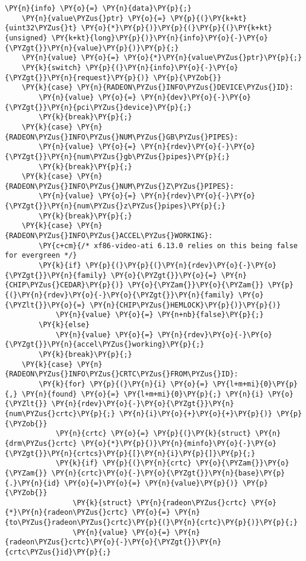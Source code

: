 \begin{Verbatim}[commandchars=\\\{\}]
	\PY{n}{info} \PY{o}{=} \PY{n}{data}\PY{p}{;}
	\PY{n}{value\PYZus{}ptr} \PY{o}{=} \PY{p}{(}\PY{k+kt}{uint32\PYZus{}t} \PY{o}{*}\PY{p}{)}\PY{p}{(}\PY{p}{(}\PY{k+kt}{unsigned} \PY{k+kt}{long}\PY{p}{)}\PY{n}{info}\PY{o}{-}\PY{o}{\PYZgt{}}\PY{n}{value}\PY{p}{)}\PY{p}{;}
	\PY{n}{value} \PY{o}{=} \PY{o}{*}\PY{n}{value\PYZus{}ptr}\PY{p}{;}
	\PY{k}{switch} \PY{p}{(}\PY{n}{info}\PY{o}{-}\PY{o}{\PYZgt{}}\PY{n}{request}\PY{p}{)} \PY{p}{\PYZob{}}
	\PY{k}{case} \PY{n}{RADEON\PYZus{}INFO\PYZus{}DEVICE\PYZus{}ID}:
		\PY{n}{value} \PY{o}{=} \PY{n}{dev}\PY{o}{-}\PY{o}{\PYZgt{}}\PY{n}{pci\PYZus{}device}\PY{p}{;}
		\PY{k}{break}\PY{p}{;}
	\PY{k}{case} \PY{n}{RADEON\PYZus{}INFO\PYZus{}NUM\PYZus{}GB\PYZus{}PIPES}:
		\PY{n}{value} \PY{o}{=} \PY{n}{rdev}\PY{o}{-}\PY{o}{\PYZgt{}}\PY{n}{num\PYZus{}gb\PYZus{}pipes}\PY{p}{;}
		\PY{k}{break}\PY{p}{;}
	\PY{k}{case} \PY{n}{RADEON\PYZus{}INFO\PYZus{}NUM\PYZus{}Z\PYZus{}PIPES}:
		\PY{n}{value} \PY{o}{=} \PY{n}{rdev}\PY{o}{-}\PY{o}{\PYZgt{}}\PY{n}{num\PYZus{}z\PYZus{}pipes}\PY{p}{;}
		\PY{k}{break}\PY{p}{;}
	\PY{k}{case} \PY{n}{RADEON\PYZus{}INFO\PYZus{}ACCEL\PYZus{}WORKING}:
		\PY{c+cm}{/* xf86-video-ati 6.13.0 relies on this being false for evergreen */}
		\PY{k}{if} \PY{p}{(}\PY{p}{(}\PY{n}{rdev}\PY{o}{-}\PY{o}{\PYZgt{}}\PY{n}{family} \PY{o}{\PYZgt{}}\PY{o}{=} \PY{n}{CHIP\PYZus{}CEDAR}\PY{p}{)} \PY{o}{\PYZam{}}\PY{o}{\PYZam{}} \PY{p}{(}\PY{n}{rdev}\PY{o}{-}\PY{o}{\PYZgt{}}\PY{n}{family} \PY{o}{\PYZlt{}}\PY{o}{=} \PY{n}{CHIP\PYZus{}HEMLOCK}\PY{p}{)}\PY{p}{)}
			\PY{n}{value} \PY{o}{=} \PY{n+nb}{false}\PY{p}{;}
		\PY{k}{else}
			\PY{n}{value} \PY{o}{=} \PY{n}{rdev}\PY{o}{-}\PY{o}{\PYZgt{}}\PY{n}{accel\PYZus{}working}\PY{p}{;}
		\PY{k}{break}\PY{p}{;}
	\PY{k}{case} \PY{n}{RADEON\PYZus{}INFO\PYZus{}CRTC\PYZus{}FROM\PYZus{}ID}:
		\PY{k}{for} \PY{p}{(}\PY{n}{i} \PY{o}{=} \PY{l+m+mi}{0}\PY{p}{,} \PY{n}{found} \PY{o}{=} \PY{l+m+mi}{0}\PY{p}{;} \PY{n}{i} \PY{o}{\PYZlt{}} \PY{n}{rdev}\PY{o}{-}\PY{o}{\PYZgt{}}\PY{n}{num\PYZus{}crtc}\PY{p}{;} \PY{n}{i}\PY{o}{+}\PY{o}{+}\PY{p}{)} \PY{p}{\PYZob{}}
			\PY{n}{crtc} \PY{o}{=} \PY{p}{(}\PY{k}{struct} \PY{n}{drm\PYZus{}crtc} \PY{o}{*}\PY{p}{)}\PY{n}{minfo}\PY{o}{-}\PY{o}{\PYZgt{}}\PY{n}{crtcs}\PY{p}{[}\PY{n}{i}\PY{p}{]}\PY{p}{;}
			\PY{k}{if} \PY{p}{(}\PY{n}{crtc} \PY{o}{\PYZam{}}\PY{o}{\PYZam{}} \PY{n}{crtc}\PY{o}{-}\PY{o}{\PYZgt{}}\PY{n}{base}\PY{p}{.}\PY{n}{id} \PY{o}{=}\PY{o}{=} \PY{n}{value}\PY{p}{)} \PY{p}{\PYZob{}}
				\PY{k}{struct} \PY{n}{radeon\PYZus{}crtc} \PY{o}{*}\PY{n}{radeon\PYZus{}crtc} \PY{o}{=} \PY{n}{to\PYZus{}radeon\PYZus{}crtc}\PY{p}{(}\PY{n}{crtc}\PY{p}{)}\PY{p}{;}
				\PY{n}{value} \PY{o}{=} \PY{n}{radeon\PYZus{}crtc}\PY{o}{-}\PY{o}{\PYZgt{}}\PY{n}{crtc\PYZus{}id}\PY{p}{;}

\end{Verbatim}
